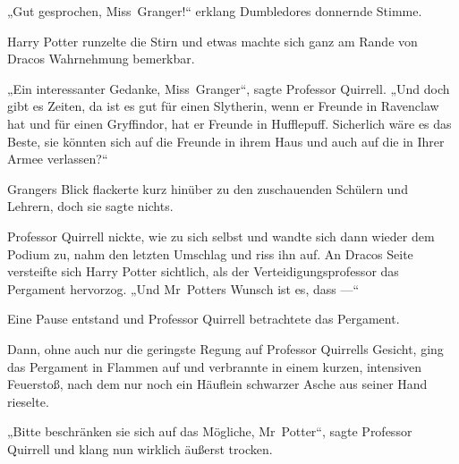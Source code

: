 „Gut gesprochen, Miss~Granger!“ erklang Dumbledores donnernde Stimme.

Harry Potter runzelte die Stirn und etwas machte sich ganz am Rande von Dracos Wahrnehmung bemerkbar.

„Ein interessanter Gedanke, Miss~Granger“, sagte Professor Quirrell.
„Und doch gibt es Zeiten, da ist es gut für einen Slytherin, wenn er Freunde in Ravenclaw hat und für einen Gryffindor, hat er Freunde in Hufflepuff. Sicherlich wäre es das Beste, sie könnten sich auf die Freunde in ihrem Haus und auch auf die in Ihrer Armee verlassen?“

Grangers Blick flackerte kurz hinüber zu den zuschauenden Schülern und Lehrern, doch sie sagte nichts.

Professor Quirrell nickte, wie zu sich selbst und wandte sich dann wieder dem Podium zu, nahm den letzten Umschlag und riss ihn auf. An Dracos Seite versteifte sich Harry Potter sichtlich, als der Verteidigungsprofessor das Pergament hervorzog.
„Und Mr~Potters Wunsch ist es, dass —“

Eine Pause entstand und Professor Quirrell betrachtete das Pergament.

Dann, ohne auch nur die geringste Regung auf Professor Quirrells Gesicht, ging das Pergament in Flammen auf und verbrannte in einem kurzen, intensiven Feuerstoß, nach dem nur noch ein Häuflein schwarzer Asche aus seiner Hand rieselte.

„Bitte beschränken sie sich auf das Mögliche, Mr~Potter“, sagte Professor Quirrell und klang nun wirklich äußerst trocken.


